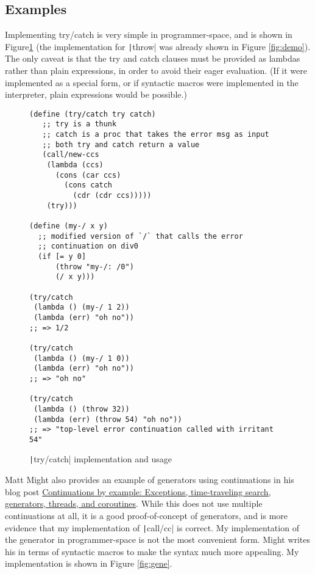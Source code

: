 \documentclass[]{article}
\begin{document}
\subsection{Examples}
\label{sec:exam}

Implementing try/catch is very simple in programmer-space, and is shown in Figure\ref{fig:tryc} (the implementation for \texttt|throw| was already shown in Figure \ref{fig:demo}). The only caveat is that the try and catch clauses must be provided as lambdas rather than plain expressions, in order to avoid their eager evaluation. (If it were implemented as a special form, or if syntactic macros were implemented in the interpreter, plain expressions would be possible.)

\begin{figure}
  \centering
\begin{verbatim}
(define (try/catch try catch)
   ;; try is a thunk
   ;; catch is a proc that takes the error msg as input
   ;; both try and catch return a value
   (call/new-ccs
    (lambda (ccs)
      (cons (car ccs)
        (cons catch
	      (cdr (cdr ccs)))))
    (try)))

(define (my-/ x y)
  ;; modified version of `/` that calls the error
  ;; continuation on div0
  (if [= y 0]
      (throw "my-/: /0")
      (/ x y)))

(try/catch
 (lambda () (my-/ 1 2))
 (lambda (err) "oh no"))
;; => 1/2

(try/catch
 (lambda () (my-/ 1 0))
 (lambda (err) "oh no"))
;; => "oh no"

(try/catch
 (lambda () (throw 32))
 (lambda (err) (throw 54) "oh no"))
;; => "top-level error continuation called with irritant 54"
\end{verbatim}
  \caption{\texttt|try/catch| implementation and usage}
  \label{fig:tryc}
\end{figure}

Matt Might also provides an example of generators using continuations in his blog post \href{https://matt.might.net/articles/programming-with-continuations--exceptions-backtracking-search-threads-generators-coroutines/}{Continuations by example: Exceptions, time-traveling search, generators, threads, and coroutines}. While this does not use multiple continuations at all, it is a good proof-of-concept of generators, and is more evidence that my implementation of \texttt|call/cc| is correct. My implementation of the generator in programmer-space is not the most convenient form. Might writes his in terms of syntactic macros to make the syntax much more appealing. My implementation is shown in Figure \ref{fig:gene}.
\end{document}
